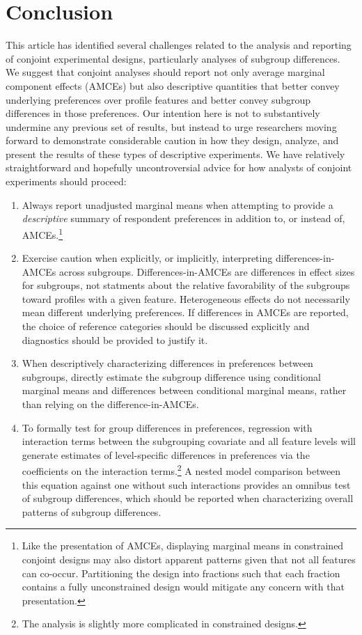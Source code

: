 \documentclass[a4paper,12pt]{article}\usepackage[]{graphicx}\usepackage[]{color}
\begin{document}
\section*{Conclusion}\label{sec:conclusion}

This article has identified several challenges related to the analysis and reporting of conjoint experimental designs, particularly analyses of subgroup differences. We suggest that conjoint analyses should report not only average marginal component effects (AMCEs) but also descriptive quantities that better convey underlying preferences over profile features and better convey subgroup differences in those preferences. Our intention here is not to substantively undermine any previous set of results, but instead to urge researchers moving forward to demonstrate considerable caution in how they design, analyze, and present the results of these types of descriptive experiments. We have relatively straightforward and hopefully uncontroversial advice for how analysts of conjoint experiments should proceed:

\begin{enumerate}
\item Always report unadjusted marginal means when attempting to provide a \textit{descriptive} summary of respondent preferences in addition to, or instead of, AMCEs.\footnote{Like the presentation of AMCEs, displaying marginal means in constrained conjoint designs may also distort apparent patterns given that not all features can co-occur. Partitioning the design into fractions such that each fraction contains a fully unconstrained design would mitigate any concern with that presentation.}

\item Exercise caution when explicitly, or implicitly, interpreting differences-in-AMCEs across subgroups. Differences-in-AMCEs are differences in effect sizes for subgroups, not statments about the relative favorability of the subgroups toward profiles with a given feature. Heterogeneous effects do not necessarily mean different underlying preferences. If differences in AMCEs are reported, the choice of reference categories should be discussed explicitly and diagnostics should be provided to justify it.

\item When descriptively characterizing differences in preferences between subgroups, directly estimate the subgroup difference using conditional marginal means and differences between conditional marginal means, rather than relying on the difference-in-AMCEs.

\item To formally test for group differences in preferences, regression with interaction terms between the subgrouping covariate and all feature levels will generate estimates of level-specific differences in preferences via the coefficients on the interaction terms.\footnote{The analysis is slightly more complicated in constrained designs.} A nested model comparison between this equation against one without such interactions provides an omnibus test of subgroup differences, which should be reported when characterizing overall patterns of subgroup differences.
\end{enumerate}
\end{document}
